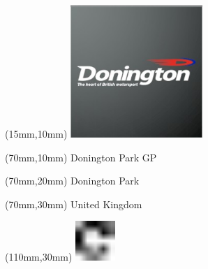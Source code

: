 \null\newpage
\begin{textblock*}{50mm}(15mm,10mm)%
\includegraphics[width=50mm]{LG/2015-05-20_00080.png}
\end{textblock*}
\begin{textblock*}{130mm}(70mm,10mm)%
{\fontsize{20}{20}\selectfont Donington Park GP}\\
\end{textblock*}
\begin{textblock*}{120mm}(70mm,20mm)%
{\fontsize{16}{16}\selectfont Donington Park}\\
\end{textblock*}
\begin{textblock*}{120mm}(70mm,30mm)%
{\fontsize{12}{12}\selectfont United Kingdom}
\end{textblock*}
\begin{textblock*}{30mm}(110mm,30mm)%
\centering
\includegraphics[height=15mm]{icons/fa-rotate-right.pdf}
\end{textblock*}
